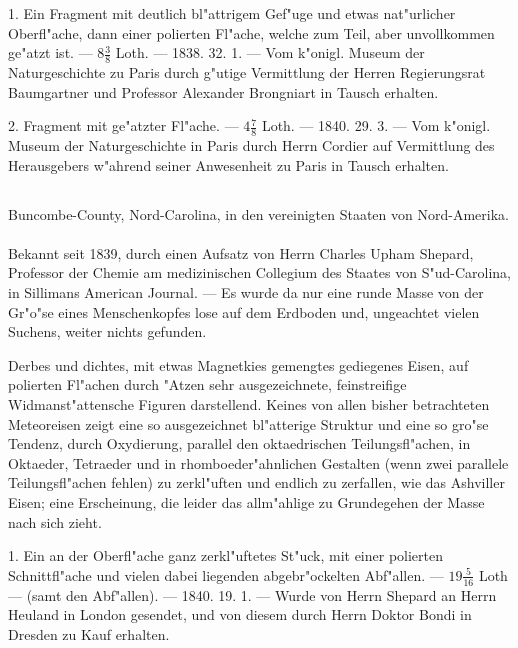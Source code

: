 \documentclass[a4paper, 11pt, oneside, polutonikogreek, german]{article}
\begin{document}
1. Ein Fragment mit deutlich bl"attrigem Gef"uge und etwas nat"urlicher Oberfl"ache, dann einer polierten Fl"ache, welche zum Teil, aber unvollkommen ge"atzt ist. --- $8\frac{3}{8}$ Loth. --- 1838. 32. 1. --- Vom k"onigl. Museum der Naturgeschichte zu Paris durch g"utige Vermittlung der Herren Regierungsrat Baumgartner und Professor Alexander Brongniart in Tausch erhalten.

2. Fragment mit ge"atzter Fl"ache. --- $4\frac{7}{8}$ Loth. --- 1840. 29. 3. --- Vom k"onigl. Museum der Naturgeschichte in Paris durch Herrn Cordier auf Vermittlung des Herausgebers w"ahrend seiner Anwesenheit zu Paris in Tausch erhalten.
\subsection{}
\begin{center}

Buncombe-County, Nord-Carolina, in den vereinigten Staaten von Nord-Amerika.
\end{center}
\paragraph{}
Bekannt seit 1839, durch einen Aufsatz von Herrn Charles Upham Shepard, Professor der Chemie am medizinischen Collegium des Staates von S"ud-Carolina, in Sillimans American Journal. --- Es wurde da nur eine runde Masse von der Gr"o"se eines Menschenkopfes lose auf dem Erdboden und, ungeachtet vielen Suchens, weiter nichts gefunden.

Derbes und dichtes, mit etwas Magnetkies gemengtes gediegenes Eisen, auf polierten Fl"achen durch "Atzen sehr ausgezeichnete, feinstreifige Widmanst"attensche Figuren darstellend. Keines von allen bisher betrachteten Meteoreisen zeigt eine so ausgezeichnet bl"atterige Struktur und eine so gro"se Tendenz, durch Oxydierung, parallel den oktaedrischen Teilungsfl"achen, in Oktaeder, Tetraeder und in rhomboeder"ahnlichen Gestalten (wenn zwei parallele Teilungsfl"achen fehlen) zu zerkl"uften und endlich zu zerfallen, wie das Ashviller Eisen; eine Erscheinung, die leider das allm"ahlige zu Grundegehen der Masse nach sich zieht.

1. Ein an der Oberfl"ache ganz zerkl"uftetes St"uck, mit einer polierten Schnittfl"ache und vielen dabei liegenden abgebr"ockelten Abf"allen. --- $19\frac{5}{16}$ Loth --- (samt den Abf"allen). --- 1840. 19. 1. --- Wurde von Herrn Shepard an Herrn Heuland in London gesendet, und von diesem durch Herrn Doktor Bondi in Dresden zu Kauf erhalten.
\end{document}
